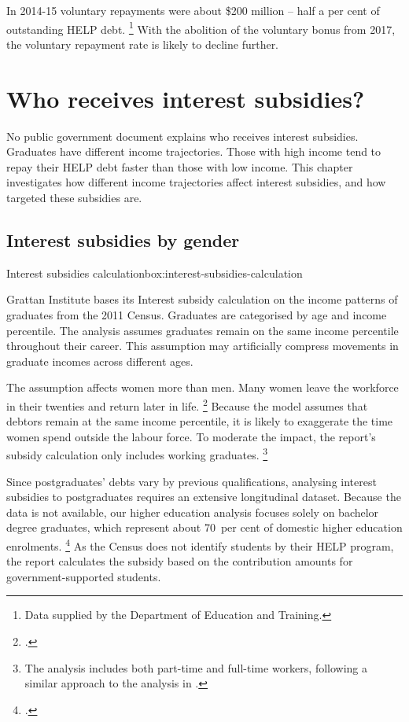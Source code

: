 \documentclass[embargoed]{grattan}
\begin{document}
In 2014-15 voluntary repayments were about \$200 million -- half a per cent of outstanding \gls{HELP} debt.%
\footnote{Data supplied by the Department of Education and Training.} With the abolition of the voluntary bonus from 2017, the voluntary repayment rate is likely to decline further.

\chapter{Who receives interest subsidies?}\label{chap:3-who-receives-interest-subsidies}

No public government document explains who receives interest subsidies.
Graduates have different income trajectories.
Those with high income tend to repay their \gls{HELP} debt faster than those with low income.
This chapter investigates how different income trajectories affect interest subsidies, and how targeted these subsidies are.

\section{Interest subsidies by gender}\label{sec:interest-subsidies-by-gender}

\begin{smallbox}{Interest subsidies calculation}{box:interest-subsidies-calculation}
\addtolength{\parskip}{-1pt}

Grattan Institute bases its \gls{Interest subsidy} calculation on the income patterns of graduates from the 2011 Census.
Graduates are categorised by age and income percentile.
The analysis assumes graduates remain on the same income percentile throughout their career.
This assumption may artificially compress movements in graduate incomes across different ages.

The assumption affects women more than men.
Many women leave the workforce in their twenties and return later in life.%
\footcite[][Figure~9]{Norton2016HELPfuturefairer} Because the model assumes that debtors remain at the same income percentile, it is likely to exaggerate the time women spend outside the labour force.
To moderate the impact, the report's subsidy calculation only includes working graduates.%
\footnote{The analysis includes both part-time and full-time workers, following a similar approach to the analysis in \textcite[][7--8]{Chapman2014InquiryprovisionsHigher}.
}

Since postgraduates’ debts vary by previous qualifications, analysing interest subsidies to postgraduates requires an extensive longitudinal dataset. Because the data is not available, our higher education analysis focuses solely on bachelor degree graduates, which represent about 70~per cent of domestic higher education enrolments.%
\footnote{\textcite[][Table 2.6]{Education2016StudentsSelectedhigher}.
} 
As the Census does not identify students by their \gls{HELP} program, the report calculates the subsidy based on the contribution amounts for government-supported students. 
\end{smallbox}
\end{document}
